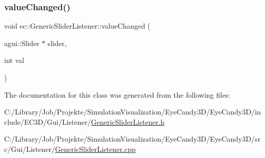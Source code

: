\mbox{\label{classec_1_1_generic_slider_listener_a884faf715962f7785174edec063aa145}} 
\subsubsection{\texorpdfstring{value\+Changed()}{valueChanged()}}
{\footnotesize\ttfamily void ec\+::\+Generic\+Slider\+Listener\+::value\+Changed (\begin{DoxyParamCaption}\item[{agui\+::\+Slider $\ast$}]{slider,  }\item[{int}]{val }\end{DoxyParamCaption})\hspace{0.3cm}{\ttfamily [override]}}



The documentation for this class was generated from the following files\+:\begin{DoxyCompactItemize}
\item 
C\+:/\+Library/\+Job/\+Projekte/\+Simulation\+Visualization/\+Eye\+Candy3\+D/\+Eye\+Candy3\+D/include/\+E\+C3\+D/\+Gui/\+Listener/\mbox{\hyperlink{_generic_slider_listener_8h}{Generic\+Slider\+Listener.\+h}}\item 
C\+:/\+Library/\+Job/\+Projekte/\+Simulation\+Visualization/\+Eye\+Candy3\+D/\+Eye\+Candy3\+D/src/\+Gui/\+Listener/\mbox{\hyperlink{_generic_slider_listener_8cpp}{Generic\+Slider\+Listener.\+cpp}}\end{DoxyCompactItemize}
